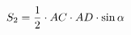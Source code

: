 \documentclass[preview]{standalone}
\begin{document}
\begin{align*}
\special{dvisvgm:raw <g id='unique000'>}S_2=\frac12\cdot AC\cdot AD\cdot \sin\alpha\special{dvisvgm:raw </g>}
\end{align*}
\end{document}
